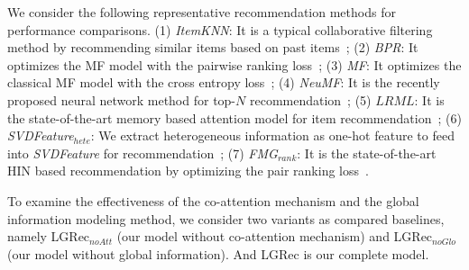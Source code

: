  We consider the following representative recommendation methods for performance comparisons. (1) \emph{ItemKNN}: It is a typical collaborative filtering method by recommending similar items based on past items~\cite{sarwar2001item}; (2) \emph{BPR}: It optimizes the MF model with the pairwise ranking loss~\cite{rendle2009bpr}; (3) \emph{MF}: It optimizes the classical MF model with the cross entropy loss~\cite{he2017neural}; (4) \emph{NeuMF}: It is the recently proposed neural network method for top-$N$ recommendation~\cite{he2017neural}; (5) $LRML$: It is the state-of-the-art memory based attention model for item recommendation~\cite{tay2018latent}; (6) \emph{SVDFeature$_{hete}$}: We extract heterogeneous information as one-hot feature to feed into \emph{SVDFeature} for recommendation~\cite{chen2012svdfeature}; (7) \emph{FMG$_{rank}$}: It is the state-of-the-art HIN based recommendation by optimizing the pair ranking loss~\cite{zhao2017meta}.

To examine the effectiveness of the co-attention mechanism and the global information modeling method, we consider two variants as compared baselines, namely LGRec$_{noAtt}$ (our model without co-attention mechanism) and LGRec$_{noGlo}$ (our model without global information). And LGRec is our complete model.



